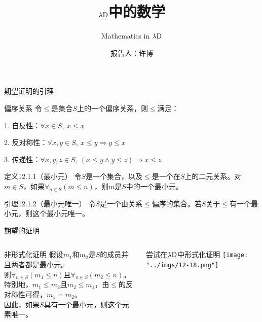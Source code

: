 \documentclass[UTF8,aspectratio=169,mathserif]{beamer}
\title{$\lambda{\rm D}$中的数学}
\subtitle{Mathematics in $\lambda{\rm D}$}
\author{报告人：许博}
\date{}
\begin{document}
	\begin{frame}
		\titlepage
	\end{frame}

	\begin{frame}[shrink]{期望证明的引理}
		\begin{block}{偏序关系}
			令$\le$是集合$S$上的一个偏序关系，则$\le$满足：
			
			1. 自反性：$\forall x\in S,\ x\le x$
			
			2. 反对称性：$\forall x,y\in S,\ x\le y\Rightarrow y\le x$
			
			3. 传递性：$\forall x,y,z\in S,\ (x\le y\land y\le z)\Rightarrow x\le z$
		\end{block}
	
		\begin{exampleblock}{定义12.1.1（最小元）}
			令$S$是一个集合，以及$\le$是一个在$S$上的二元关系。对$m\in S$，如果$\forall_{n\in S}(m\le n)$，则$m$是$S$中的一个最小元。
		\end{exampleblock}
		
		\begin{exampleblock}{引理12.1.2（最小元唯一）}
			令$S$是一个由关系$\le$偏序的集合。若$S$关于$\le$有一个最小元，则这个最小元唯一。
		\end{exampleblock}
	\end{frame}

	\begin{frame}{期望的证明}
		\begin{columns}
			\begin{column}{0.44\textwidth}
				\begin{block}{非形式化证明}
					假设$m_1$和$m_2$是$S$的成员并且两者都是最小元。\\
					则$\forall_{n\in S}(m_1\le n)$且$\forall_{n\in S}(m_2\le n)$。\\
					特别地，$m_1\le m_2$且$m_2\le m_1$，由$\le$的反对称性可得，$m_1=m_2$。\\
					因此，如果$S$具有一个最小元，则这个元素唯一。
				\end{block}
			\end{column}
			\begin{column}{0.56\textwidth}
				\begin{block}{尝试在$\lambda{\rm D}$中形式化证明}
					\texttt{[image: "../imgs/12-18.png"]}
				\end{block}
			\end{column}
		\end{columns}
	\end{frame}
\end{document}
